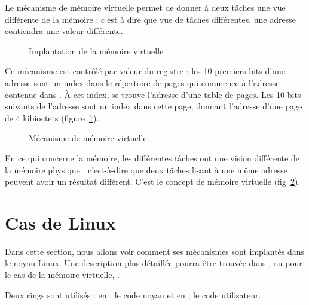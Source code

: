 Le mécanisme de mémoire virtuelle permet de donner à deux tâches une vue
différente de la mémoire : c'est à dire que vue de tâches différentes, une
adresse contiendra une valeur différente.

\begin{figure}

\caption{Implantation de la mémoire virtuelle}
\label{fig:pagetables}
\end{figure}

Ce mécanisme est contrôlé par valeur du registre \crtrois : les 10 premiers bits
d'une adresse sont un index dans le répertoire de pages qui commence à l'adresse
contenue dans \crtrois. À cet index, se trouve l'adresse d'une table de pages.
Les 10 bits suivants de l'adresse sont un index dans cette page, donnant
l'adresse d'une page de 4 kibioctets (figure~\ref{fig:pagetables}).

\begin{figure} %
\centering
{}
\caption{Mécanisme de mémoire virtuelle.}
\label{fig:memoire-virtuelle}
\end{figure} %

En ce qui concerne la mémoire, les différentes tâches ont une vision différente
de la mémoire physique : c'est-à-dire que deux tâches lisant à une même adresse
peuvent avoir un résultat différent. C'est le concept de mémoire virtuelle
(fig~\ref{fig:memoire-virtuelle}).

\section{Cas de Linux}

Dans cette section, nous allons voir comment ses mécanismes sont implantés dans
le noyau Linux. Une description plus détaillée pourra être trouvée dans
\cite{UnderstandingTheLinuxKernel}, ou pour le cas de la mémoire virtuelle,
\cite{LinuxVMM}.

Deux rings sont utilisés : en , le code noyau et en , le code
utilisateur.

